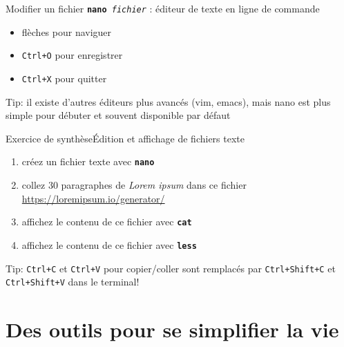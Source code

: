 \documentclass[
aspectratio=169 %
]{beamer}
\newcommand{\cmd}[1]{\texttt{\textbf{#1}}}
\newcommand{\args}[1]{\texttt{\textit{#1}}}
\begin{document}
\begin{frame}{Modifier un fichier}
    \cmd{nano}\args{ fichier} : éditeur de texte en ligne de commande
    \begin{itemize}
        \item flèches pour naviguer
        \item \texttt{Ctrl+O} pour enregistrer
        \item \texttt{Ctrl+X} pour quitter
    \end{itemize}
    \bigskip

    \alert{Tip:} il existe d'autres éditeurs plus avancés (vim, emacs), mais
    nano est plus simple pour débuter et souvent disponible par défaut
\end{frame}

\begin{frame}{Exercice de synthèse}{Édition et affichage de fichiers texte}

    \begin{enumerate}
        \item créez un fichier texte avec \cmd{nano}
        \item collez 30 paragraphes de \textit{Lorem ipsum} dans ce
              fichier\\
              \href{https://loremipsum.io/generator
                  /?n=30\&t=p}{https://loremipsum.io/generator/}
        \item affichez le contenu de ce fichier avec \cmd{cat}
        \item affichez le contenu de ce fichier avec \cmd{less}
    \end{enumerate}

    \bigskip
    \alert{Tip:} \texttt{Ctrl+C} et \texttt{Ctrl+V} pour copier/coller
    sont remplacés par \texttt{Ctrl+Shift+C} et \texttt{Ctrl+Shift+V} dans le
    terminal!
\end{frame}

\section{Des outils pour se simplifier la vie} \frame{\sectionpage}
\end{document}
